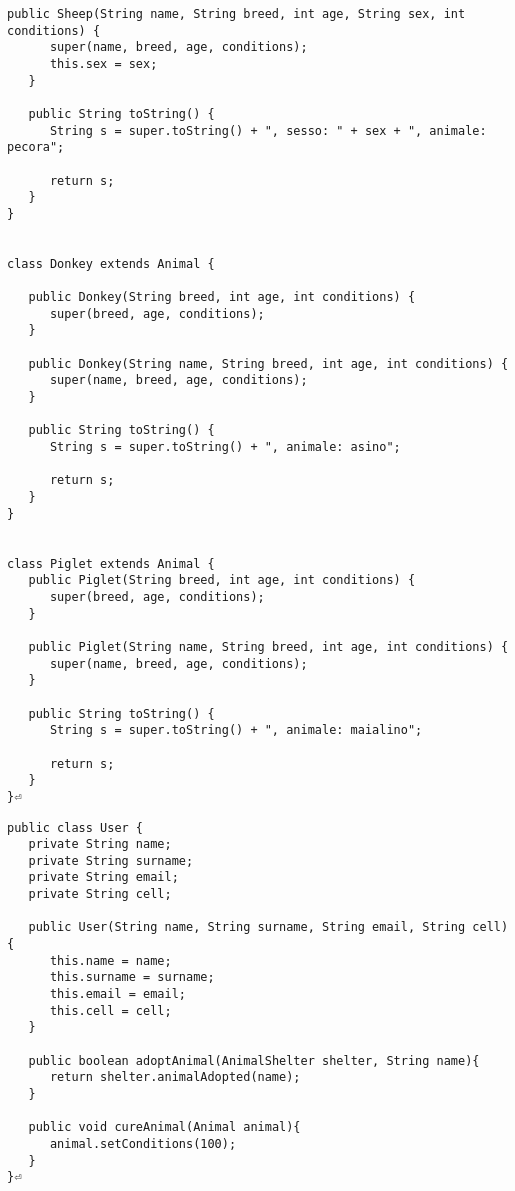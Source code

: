\documentclass{article}
\begin{document}
\begin{lstlisting}[caption={Animal.java}]
   public Sheep(String name, String breed, int age, String sex, int conditions) {
      super(name, breed, age, conditions);
      this.sex = sex;
   }

   public String toString() {
      String s = super.toString() + ", sesso: " + sex + ", animale: pecora";

      return s;
   }
}


class Donkey extends Animal {

   public Donkey(String breed, int age, int conditions) {
      super(breed, age, conditions);
   }

   public Donkey(String name, String breed, int age, int conditions) {
      super(name, breed, age, conditions);
   }

   public String toString() {
      String s = super.toString() + ", animale: asino";

      return s;
   }
}


class Piglet extends Animal {
   public Piglet(String breed, int age, int conditions) {
      super(breed, age, conditions);
   }

   public Piglet(String name, String breed, int age, int conditions) {
      super(name, breed, age, conditions);
   }

   public String toString() {
      String s = super.toString() + ", animale: maialino";

      return s;
   }
}⏎  
	\end{lstlisting}
	
\begin{lstlisting}[caption = {User.java}]
	public class User {
   private String name;
   private String surname;
   private String email;
   private String cell;

   public User(String name, String surname, String email, String cell){
      this.name = name;
      this.surname = surname;
      this.email = email;
      this.cell = cell;
   }

   public boolean adoptAnimal(AnimalShelter shelter, String name){
      return shelter.animalAdopted(name);
   }

   public void cureAnimal(Animal animal){
      animal.setConditions(100);
   }
}⏎ 
\end{lstlisting}
\end{document}
